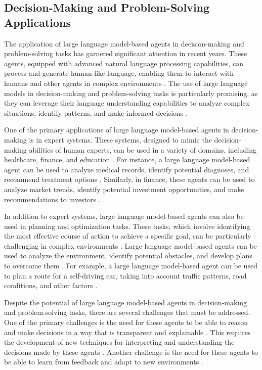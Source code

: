 \documentclass[11pt,a4paper]{article}
\begin{document}
\subsection{Decision-Making and Problem-Solving Applications}


The application of large language model-based agents in decision-making and problem-solving tasks has garnered significant attention in recent years. These agents, equipped with advanced natural language processing capabilities, can process and generate human-like language, enabling them to interact with humans and other agents in complex environments \cite{arxiv:1906.09379}. The use of large language models in decision-making and problem-solving tasks is particularly promising, as they can leverage their language understanding capabilities to analyze complex situations, identify patterns, and make informed decisions \cite{doi:10.18653/v1/2023.acl-long.411}.

One of the primary applications of large language model-based agents in decision-making is in expert systems. These systems, designed to mimic the decision-making abilities of human experts, can be used in a variety of domains, including healthcare, finance, and education \cite{arxiv:2304.05332}. For instance, a large language model-based agent can be used to analyze medical records, identify potential diagnoses, and recommend treatment options \cite{doi:10.1038/s41746-024-01083-y}. Similarly, in finance, these agents can be used to analyze market trends, identify potential investment opportunities, and make recommendations to investors \cite{arxiv:2408.06361}.

In addition to expert systems, large language model-based agents can also be used in planning and optimization tasks. These tasks, which involve identifying the most effective course of action to achieve a specific goal, can be particularly challenging in complex environments \cite{arxiv:2205.05718}. Large language model-based agents can be used to analyze the environment, identify potential obstacles, and develop plans to overcome them \cite{arxiv:2305.17144}. For example, a large language model-based agent can be used to plan a route for a self-driving car, taking into account traffic patterns, road conditions, and other factors \cite{doi:10.1109/mnet.2024.3435752}.

Despite the potential of large language model-based agents in decision-making and problem-solving tasks, there are several challenges that must be addressed. One of the primary challenges is the need for these agents to be able to reason and make decisions in a way that is transparent and explainable \cite{arxiv:2306.03917}. This requires the development of new techniques for interpreting and understanding the decisions made by these agents \cite{arxiv:2308.03688}. Another challenge is the need for these agents to be able to learn from feedback and adapt to new environments \cite{arxiv:2308.05960}.
\end{document}

